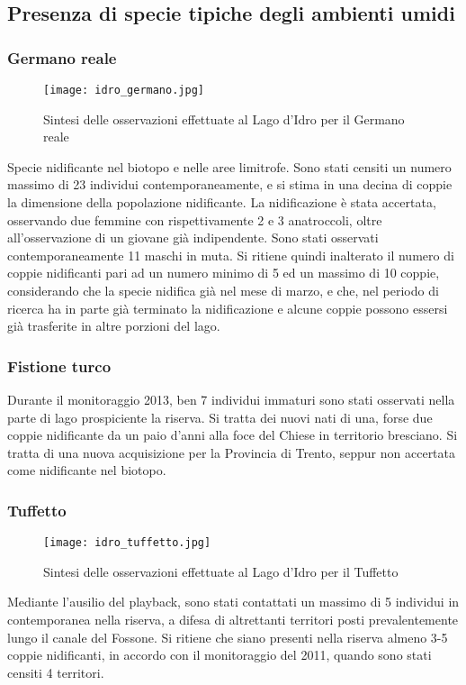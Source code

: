 \documentclass[11pt,a4paper,twoside]{memoir}
\begin{document}
\subsection{Presenza di specie tipiche degli ambienti umidi}
\subsubsection{Germano reale}
\vspace*{\fill} \begin{figure}[H]
  \centering
  \texttt{[image: idro\_germano.jpg]}
  \caption{Sintesi delle osservazioni effettuate al Lago d'Idro per il Germano reale}
\end{figure}\vspace*{\fill}
Specie nidificante nel biotopo e nelle aree limitrofe. Sono stati censiti un numero massimo di 23 individui contemporaneamente, e si stima in una decina di coppie la dimensione della popolazione nidificante. La nidificazione è stata accertata, osservando due femmine con rispettivamente 2 e 3 anatroccoli, oltre all'osservazione di un giovane già indipendente. Sono stati osservati contemporaneamente 11 maschi in muta. Si ritiene quindi inalterato il numero di coppie nidificanti pari ad un numero minimo di 5 ed un massimo di 10 coppie, considerando che la specie nidifica già nel mese di marzo, e che, nel periodo di ricerca ha in parte già terminato la nidificazione e alcune coppie possono essersi già trasferite in altre porzioni del lago.
\subsubsection{Fistione turco}
Durante il monitoraggio 2013, ben 7 individui immaturi sono stati osservati nella parte di lago prospiciente la riserva. Si tratta dei nuovi nati di una, forse due coppie nidificante da un paio d’anni alla foce del Chiese in territorio bresciano. Si tratta di una nuova acquisizione per la Provincia di Trento, seppur non accertata come nidificante nel biotopo.
\subsubsection{Tuffetto}
\vspace*{\fill} \begin{figure}[H]
  \centering
  \texttt{[image: idro\_tuffetto.jpg]}
  \caption{Sintesi delle osservazioni effettuate al Lago d'Idro per il Tuffetto}
\end{figure}\vspace*{\fill}
Mediante l'ausilio del playback, sono stati contattati un massimo di 5 individui in contemporanea nella riserva, a difesa di altrettanti territori posti prevalentemente lungo il canale del Fossone. Si ritiene che siano presenti nella riserva almeno 3-5 coppie nidificanti, in accordo con il monitoraggio del 2011, quando sono stati censiti 4 territori.
\end{document}
